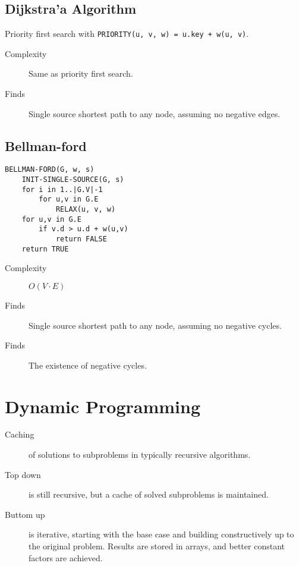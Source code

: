 \documentclass[landscape]{cheat}
\begin{document}
\begin{multicols*}{3}
\subsection{Dijkstra'a Algorithm}
Priority first search with \lstinline{PRIORITY(u, v, w) = u.key + w(u, v)}.
\begin{description}
    \item[Complexity] Same as priority first search.
    \item[Finds] Single source shortest path to any node, assuming no negative edges.
\end{description}

\subsection{Bellman-ford}
\begin{lstlisting}
BELLMAN-FORD(G, w, s)
    INIT-SINGLE-SOURCE(G, s)
    for i in 1..|G.V|-1
        for u,v in G.E
            RELAX(u, v, w)
    for u,v in G.E
        if v.d > u.d + w(u,v)
            return FALSE
    return TRUE
\end{lstlisting}

\begin{description}
    \item[Complexity] $O(V\cdot E)$
    \item[Finds] Single source shortest path to any node, assuming no negative cycles.
    \item[Finds] The existence of negative cycles.
\end{description}

\section{Dynamic Programming}
\begin{description}
    \item[Caching] of solutions to subproblems in typically recursive algorithms.
    \item[Top down] is still recursive, but a cache of solved subproblems is maintained.
    \item[Buttom up] is iterative, starting with the base case and building constructively up to the original problem.
        Results are stored in arrays, and better constant factors are achieved.
\end{description}


\end{multicols*}
\end{document}
